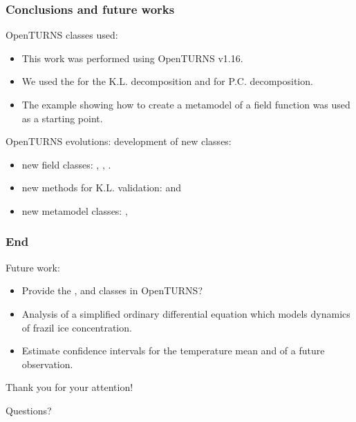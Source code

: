 \documentclass[10pt]{beamer}
\begin{document}

\begin{frame}
\frametitle{Conclusions and future works}

OpenTURNS classes used:
\begin{itemize}
\item This work was performed using OpenTURNS v1.16. 
\item We used the  for the K.L. decomposition 
and  for P.C. decomposition. 
\item The example \cite{MetamodelFieldOT} showing how to create a metamodel 
of a field function was used as a starting point. 
\end{itemize}

OpenTURNS evolutions: development of new classes:
\begin{itemize}
\item new field classes: 
, , 
. 
\item new methods for K.L. validation:  
and 
\item new metamodel classes: , 
\end{itemize}


\end{frame}


\begin{frame}
\frametitle{End}

Future work:
\begin{itemize}
\item Provide the , 
 and  
classes in OpenTURNS?
\item Analysis of a simplified ordinary differential equation which models 
dynamics of frazil ice concentration. 
\item Estimate confidence intervals for the temperature mean and 
of a future observation. 
\end{itemize}

\hspace{1cm}

\begin{center}
Thank you for your attention!

Questions?
\end{center}

\end{frame}
\end{document}
